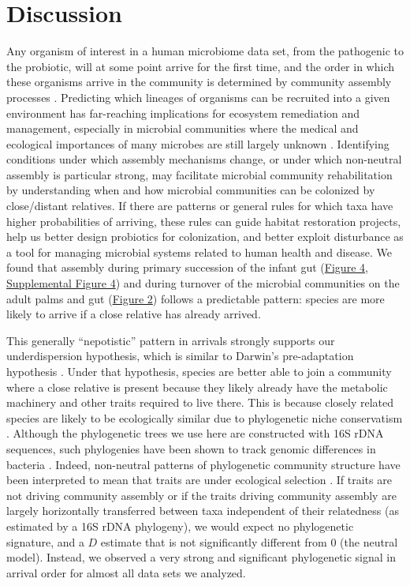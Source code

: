 \documentclass{article}
\begin{document}
\section{Discussion}
Any organism of interest in a human microbiome data set, from the pathogenic to the probiotic, will at some point arrive for the first time, and the order in which these organisms arrive 
in the community is determined by community assembly processes \cite{Nemergut2013}. Predicting which lineages of organisms can be recruited into a given environment has far-reaching implications for ecosystem remediation and management, especially in microbial communities where the medical and ecological importances of many microbes are still largely unknown \cite{Martiny2015,Vazquez-Baeza2018}. Identifying conditions under which assembly mechanisms change, or under which non-neutral assembly is particular strong, may facilitate microbial community rehabilitation by understanding when and how microbial communities can be colonized by close/distant relatives. If there are patterns or general rules for which taxa have higher probabilities of arriving, these rules can guide habitat restoration projects, help us better design probiotics for colonization, and better exploit disturbance as a tool for managing microbial systems related to human health and disease. We found that assembly during primary succession of the infant gut (\hyperref[sec:figure4]{Figure 4}, \hyperref[sec:figureS4]{Supplemental Figure 4}) and during turnover of the microbial communities on the adult palms and gut (\hyperref[sec:figure2]{Figure 2}) follows a predictable pattern: species are more likely to arrive if a close relative has already arrived.
\par
This generally “nepotistic” pattern in arrivals strongly supports our underdispersion hypothesis, which is similar to Darwin’s pre-adaptation hypothesis \cite{Darwin1859}. Under that hypothesis, species are better able to join a community where a close relative is present because they likely already have the metabolic machinery and other traits required to live there. This is because closely related species are likely to be ecologically similar due to phylogenetic niche conservatism \cite{Wiens2010}. Although the phylogenetic trees we use here are constructed with 16S rDNA sequences, such phylogenies have been shown to track genomic differences in bacteria \cite{Zaneveld2010,Langille2013}. Indeed, non-neutral patterns of phylogenetic community structure have been interpreted to mean that traits are under ecological selection \cite{Webb2000,Webb2002,CavenderBares2004,Gerhold2015}. If traits are not driving community assembly \cite{Hubbell2001} or if the traits driving community assembly are largely horizontally transferred between taxa independent of their relatedness (as estimated by a 16S rDNA phylogeny), we would expect no phylogenetic signature, and a \(D\) estimate that is not significantly different from 0 (the neutral model). Instead, we observed a very strong and significant phylogenetic signal in arrival order for almost all data sets we analyzed.
\end{document}
